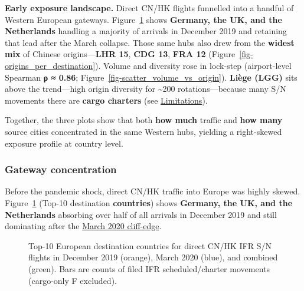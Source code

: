 \documentclass[
  authoryear,
  preprint,
  3p,
  onecolumn]{elsarticle}
\begin{document}
\textbf{Early exposure landscape.} Direct CN/HK flights funnelled into a
handful of Western European gateways.
Figure~\ref{fig-top10_eu_dest_cntry} shows \textbf{Germany, the UK, and
the Netherlands} handling a majority of arrivals in December 2019 and
retaining that lead after the March collapse. Those same hubs also drew
from the \textbf{widest mix} of Chinese origins---\textbf{LHR 15},
\textbf{CDG 13}, \textbf{FRA 12}
(Figure~\ref{fig-origins_per_destination}). Volume and diversity rose in
lock-step (airport-level Spearman \textbf{ρ ≈ 0.86};
Figure~\ref{fig-scatter_volume_vs_origin}). \textbf{Liège (LGG)} sits
above the trend---high origin diversity for \textasciitilde200
rotations---because many S/N movements there are \textbf{cargo charters}
(see \hyperref[limitations]{Limitations}).

Together, the three plots show that both \textbf{how much} traffic and
\textbf{how many} source cities concentrated in the same Western hubs,
yielding a right-skewed exposure profile at country level.

\subsubsection{Gateway concentration}\label{gateway-concentration}

Before the pandemic shock, direct CN/HK traffic into Europe was highly
skewed. Figure~\ref{fig-top10_eu_dest_cntry} (Top-10 destination
\textbf{countries}) shows \textbf{Germany, the UK, and the Netherlands}
absorbing over half of all arrivals in December 2019 and still
dominating after the \hyperref[march-cliff]{March 2020 cliff-edge}.

\label{cell-fig-top10_eu_dest_cntry}
\begin{figure}[H]


\caption{\label{fig-top10_eu_dest_cntry}Top-10 European destination
countries for direct CN/HK IFR S/N flights in December 2019 (orange),
March 2020 (blue), and combined (green). Bars are counts of filed IFR
scheduled/charter movements (cargo-only F excluded).}

\end{figure}%
\end{document}
